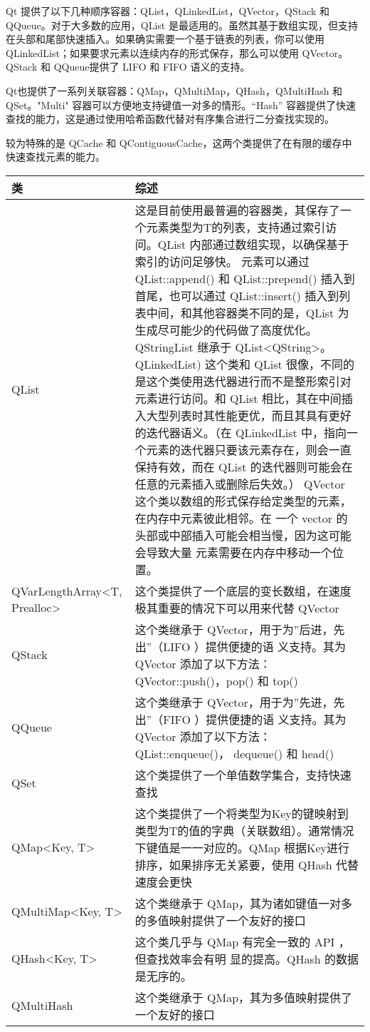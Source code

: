 Qt 提供了以下几种顺序容器：QList，QLinkedList，QVector，QStack 和 QQueue。对于大多数的应用，QList 是最适用的。虽然其基于数组实现，但支持在头部和尾部快速插入。如果确实需要一个基于链表的列表，你可以使用 QLinkedList；如果要求元素以连续内存的形式保存，那么可以使用 QVector。QStack 和 QQueue提供了 LIFO 和 FIFO 语义的支持。

Qt也提供了一系列关联容器：QMap，QMultiMap，QHash，QMultiHash 和 QSet。"Multi" 容器可以方便地支持键值一对多的情形。“Hash” 容器提供了快速查找的能力，这是通过使用哈希函数代替对有序集合进行二分查找实现的。

较为特殊的是 QCache 和 QContiguousCache，这两个类提供了在有限的缓存中
快速查找元素的能力。


\begin{tabular}{|l|l|}
\hline
类&综述 \\
\hline
QList&	这是目前使用最普遍的容器类，其保存了一个元素类型为T的列表，支持通过索引访问。QList 内部通过数组实现，以确保基于索引的访问足够快。
元素可以通过 QList::append() 和 QList::prepend() 插入到首尾，也可以通过 QList::insert() 插入到列表中间，和其他容器类不同的是，QList 为生成尽可能少的代码做了高度优化。QStringList 继承于 QList<QString>。
QLinkedList)	这个类和 QList 很像，不同的是这个类使用迭代器进行而不是整形索引对元素进行访问。和 QList 相比，其在中间插入大型列表时其性能更优，而且其具有更好的迭代器语义。（在 QLinkedList 中，指向一个元素的迭代器只要该元素存在，则会一直保持有效，而在 QList 的迭代器则可能会在任意的元素插入或删除后失效。）
QVector	这个类以数组的形式保存给定类型的元素，在内存中元素彼此相邻。在
       一个 vector 的头部或中部插入可能会相当慢，因为这可能会导致大量
       元素需要在内存中移动一个位置。\\
\hline
QVarLengthArray<T, Prealloc>&	这个类提供了一个底层的变长数组，在速度极其重要的情况下可以用来代替 QVector\\
QStack&	这个类继承于 QVector，用于为”后进，先出”（LIFO ）提供便捷的语
        义支持。其为 QVector 添加了以下方法：QVector::push()，pop() 和
        top()\\
\hline
QQueue&	这个类继承于 QVector，用于为”先进，先出”（FIFO ）提供便捷的语
        义支持。其为 QVector 添加了以下方法：QList::enqueue()，
        dequeue() 和 head()\\
\hline
QSet&	这个类提供了一个单值数学集合，支持快速查找\\
\hline
QMap<Key, T>&	这个类提供了一个将类型为Key的键映射到类型为T的值的字典（关联数组）。通常情况下键值是一一对应的。QMap 根据Key进行排序，如果排序无关紧要，使用 QHash 代替速度会更快\\
\hline
QMultiMap<Key, T>&	这个类继承于 QMap，其为诸如键值一对多的多值映射提供了一个友好的接口\\
\hline
QHash<Key, T>&	这个类几乎与 QMap 有完全一致的 API ，但查找效率会有明
               显的提高。QHash 的数据是无序的。\\
\hline
QMultiHash&	这个类继承于 QMap，其为多值映射提供了一个友好的接口\\
\hline
\end{tabular}


